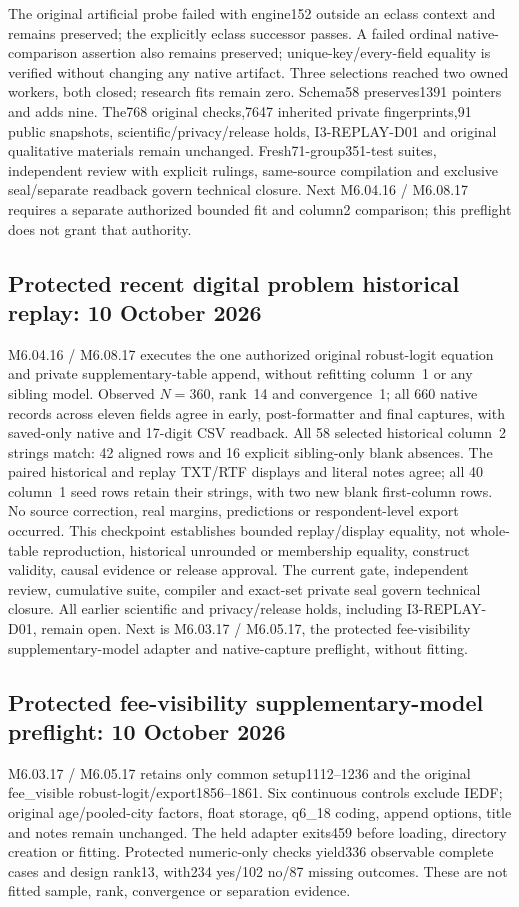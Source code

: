 \documentclass[11pt,a4paper]{article}
\begin{document}
The original artificial probe failed with engine152 outside an eclass context and remains preserved; the explicitly eclass successor passes. A failed ordinal native-comparison assertion also remains preserved; unique-key/every-field equality is verified without changing any native artifact. Three selections reached two owned workers, both closed; research fits remain zero. Schema58 preserves1391 pointers and adds nine. The768 original checks,7647 inherited private fingerprints,91 public snapshots, scientific/privacy/release holds, I3-REPLAY-D01 and original qualitative materials remain unchanged. Fresh71-group351-test suites, independent review with explicit rulings, same-source compilation and exclusive seal/separate readback govern technical closure. Next M6.04.16 / M6.08.17 requires a separate authorized bounded fit and column2 comparison; this preflight does not grant that authority.

\subsection*{Protected recent digital problem historical replay: 10 October 2026}
M6.04.16 / M6.08.17 executes the one authorized original robust-logit equation and private supplementary-table append, without refitting column~1 or any sibling model. Observed $N=360$, rank~14 and convergence~1; all 660 native records across eleven fields agree in early, post-formatter and final captures, with saved-only native and 17-digit CSV readback. All 58 selected historical column~2 strings match: 42 aligned rows and 16 explicit sibling-only blank absences. The paired historical and replay TXT/RTF displays and literal notes agree; all 40 column~1 seed rows retain their strings, with two new blank first-column rows. No source correction, real margins, predictions or respondent-level export occurred. This checkpoint establishes bounded replay/display equality, not whole-table reproduction, historical unrounded or membership equality, construct validity, causal evidence or release approval. The current gate, independent review, cumulative suite, compiler and exact-set private seal govern technical closure. All earlier scientific and privacy/release holds, including I3-REPLAY-D01, remain open. Next is M6.03.17 / M6.05.17, the protected fee-visibility supplementary-model adapter and native-capture preflight, without fitting.


\subsection*{Protected fee-visibility supplementary-model preflight: 10 October 2026}
M6.03.17 / M6.05.17 retains only common setup1112--1236 and the original fee\_visible robust-logit/export1856--1861. Six continuous controls exclude IEDF; original age/pooled-city factors, float storage, q6\_18 coding, append options, title and notes remain unchanged. The held adapter exits459 before loading, directory creation or fitting. Protected numeric-only checks yield336 observable complete cases and design rank13, with234 yes/102 no/87 missing outcomes. These are not fitted sample, rank, convergence or separation evidence.
\end{document}
